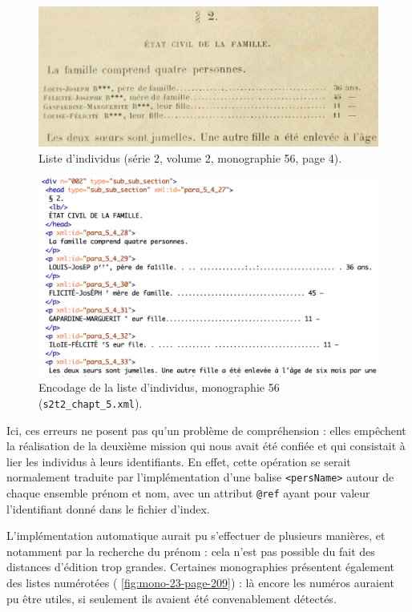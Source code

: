 \begin{figure}[ht]
    \centering
    \includegraphics[width=14cm]{img/mono-56-page-4.jpg}
    \caption[Liste d'individus au début du paragraphe 2 (\no{} 56)]{Liste d'individus (série 2, volume 2, monographie \no{} 56, page 4).}
    \label{fig:mono-56-page-4}
\end{figure}

\begin{figure}[ht]
    \includegraphics[width=14cm]{img/mono-56-page-4-code.png}
    \caption[Encodage de la liste d'individus (\no{} 56)]{Encodage de la liste d'individus, monographie \no{} 56 (\texttt{s2t2\_chapt\_5.xml}).}
    \label{fig:mono-56-page-4-code}
\end{figure}

Ici, ces erreurs ne posent pas qu'un problème de compréhension : elles empêchent la réalisation de la deuxième mission qui nous avait été confiée et qui consistait à lier les individus à leurs identifiants. En effet, cette opération se serait normalement traduite par l'implémentation d'une balise \texttt{<persName>} autour de chaque ensemble prénom et nom, avec un attribut \texttt{@ref} ayant pour valeur l'identifiant donné dans le fichier d'index.

L'implémentation automatique aurait pu s'effectuer de plusieurs manières, et notamment par la recherche du prénom : cela n'est pas possible du fait des distances d'édition trop grandes. Certaines monographies présentent également des listes numérotées (\fig{} \ref{fig:mono-23-page-209}) : là encore les numéros auraient pu être utiles, si seulement ils avaient été convenablement détectés.

